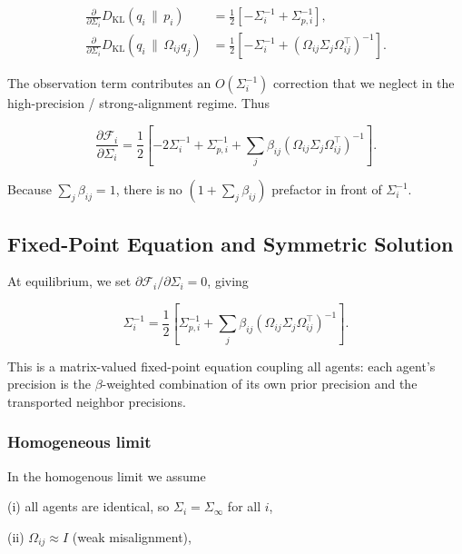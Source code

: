 \documentclass[twoside,11pt]{article}
\begin{document}
\begin{align}
\frac{\partial}{\partial \Sigma_i}
D_{\mathrm{KL}}(q_i \,\|\, p_i)
&=\frac{1}{2}\left[
-\Sigma_i^{-1}
+ \Sigma_{p,i}^{-1}
\right],
\\[6pt]
\frac{\partial}{\partial \Sigma_i}
D_{\mathrm{KL}}(q_i \,\|\, \Omega_{ij} q_j)
&=
\frac{1}{2}\left[
-\Sigma_i^{-1}
+ (\Omega_{ij}\Sigma_j\Omega_{ij}^\top)^{-1}
\right].
\end{align}

The observation term contributes an $O(\Sigma_i^{-1})$ correction that we neglect in the high-precision / strong-alignment regime. Thus

\begin{equation}
\boxed{
\frac{\partial \mathcal{F}_i}{\partial \Sigma_i}
=\frac{1}{2}
\left[
-2 \Sigma_i^{-1}
+ \Sigma_{p,i}^{-1}
+ \sum_j \beta_{ij}
(\Omega_{ij}\Sigma_j\Omega_{ij}^\top)^{-1}
\right].
}
\label{eq:Sigma_gradient_final}
\end{equation}

Because $\sum_j \beta_{ij} = 1$, there is no $(1 + \sum_j \beta_{ij})$ prefactor in front of $\Sigma_i^{-1}$.

\subsection{Fixed-Point Equation and Symmetric Solution}

At equilibrium, we set $\partial \mathcal{F}_i / \partial \Sigma_i = 0$, giving

\begin{equation}
\Sigma_i^{-1}
=\frac{1}{2}
\left[
\Sigma_{p,i}^{-1}
+ \sum_j \beta_{ij}
(\Omega_{ij}\Sigma_j\Omega_{ij}^\top)^{-1}
\right].
\label{eq:sigma_fixed_point_beta}
\end{equation}

This is a matrix-valued fixed-point equation coupling all agents: each agent’s precision is the $\beta$-weighted combination of its own prior precision and the transported neighbor precisions.

\subsubsection{Homogeneous limit}

In the homogenous limit we assume 

(i) all agents are identical, so $\Sigma_i = \Sigma_\infty$ for all $i$,

(ii) $\Omega_{ij} \approx I$ (weak misalignment),
\end{document}

